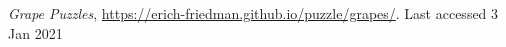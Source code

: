 \begin{thebibliography}{8}

\textit{Grape Puzzles}, \url{https://erich-friedman.github.io/puzzle/grapes/}. Last accessed 3
Jan 2021
\end{thebibliography}